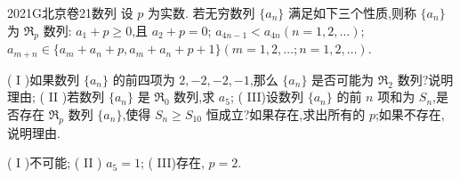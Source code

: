 
\begin{problem}{2021}{G}{北京卷}{21}{数列}
设 $p$ 为实数. 若无穷数列 $\{a_n\}$ 满足如下三个性质,则称 $\{a_n\}$ 为 $\mathfrak{R}_p$ 数列:
$ a_1 + p \geqslant 0$,且 $a_2 + p = 0$;
$ a_{4n-1} < a_{4n} (n=1,2,\dots)$;
$ a_{m+n} \in \{a_m + a_n + p, a_m + a_n + p + 1\} (m=1,2,\dots; n=1,2,\dots)$.

( I )如果数列 $\{a_n\}$ 的前四项为 $2,-2,-2,-1$,那么 $\{a_n\}$ 是否可能为 $\mathfrak{R}_2$ 数列?说明理由;
( II )若数列 $\{a_n\}$ 是 $\mathfrak{R}_0$ 数列,求 $a_5$;
( III)设数列 $\{a_n\}$ 的前 $n$ 项和为 $S_n$,是否存在 $\mathfrak{R}_p$ 数列 $\{a_n\}$,使得 $S_n \geqslant S_{10}$ 恒成立?如果存在,求出所有的 $p$;如果不存在,说明理由.
\end{problem}

\begin{answer}
( I )不可能; ( II ) $a_5=1$; ( III)存在, $p=2$.
\end{answer}

